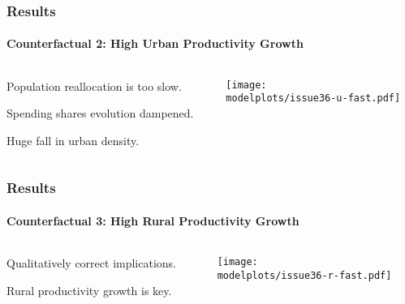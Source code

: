 \documentclass[aspectratio=169]{beamer}
\begin{document}
\begin{frame}
\frametitle{Results}
\framesubtitle{Counterfactual 2: High Urban Productivity Growth}

\begin{columns}
\begin{column}{0.3\textwidth}
\begin{midi}
\item Population reallocation is too slow.
\item Spending shares evolution dampened.
\item Huge fall in urban density.
\end{midi}
\end{column}
\begin{column}{0.7\textwidth}
\begin{adjustbox}{center}
\texttt{[image: \\modelplots/issue36-u-fast.pdf]}\end{adjustbox}
\end{column}\end{columns}
\end{frame}

\begin{frame}
\frametitle{Results}
\framesubtitle{Counterfactual 3: High Rural Productivity Growth}

\begin{columns}
\begin{column}{0.3\textwidth}
\begin{midi}
\item Qualitatively correct implications.
\item Rural productivity growth is key.
\end{midi}
\end{column}
\begin{column}{0.7\textwidth}
\begin{adjustbox}{center}
\texttt{[image: \\modelplots/issue36-r-fast.pdf]}\end{adjustbox}
\end{column}\end{columns}
\end{frame}
\end{document}
